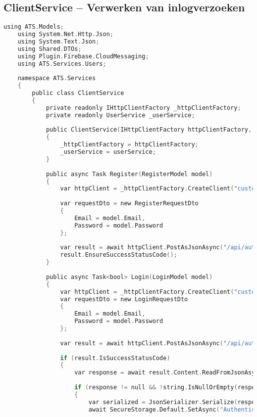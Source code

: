 \subsection{ClientService – Verwerken van inlogverzoeken}

\begin{lstlisting}[language=C, caption=Authenticatie via de ClientService, label=lst:login-clientservice]
    using ATS.Models;
    using System.Net.Http.Json;
    using System.Text.Json;
    using Shared.DTOs;
    using Plugin.Firebase.CloudMessaging;
    using ATS.Services.Users;
    
    namespace ATS.Services
    {
        public class ClientService
        {
            private readonly IHttpClientFactory _httpClientFactory;
            private readonly UserService _userService;
            
            public ClientService(IHttpClientFactory httpClientFactory, UserService userService)
            {
                _httpClientFactory = httpClientFactory;
                _userService = userService;
            }
            
            public async Task Register(RegisterModel model)
            {
                var httpClient = _httpClientFactory.CreateClient("custom-httpclient");
                
                var requestDto = new RegisterRequestDto
                {
                    Email = model.Email,
                    Password = model.Password
                };
                
                var result = await httpClient.PostAsJsonAsync("/api/auth/register", requestDto);
                result.EnsureSuccessStatusCode(); 
            }
            
            public async Task<bool> Login(LoginModel model)
            {
                var httpClient = _httpClientFactory.CreateClient("custom-httpclient");
                var requestDto = new LoginRequestDto
                {
                    Email = model.Email,
                    Password = model.Password
                };
                
                var result = await httpClient.PostAsJsonAsync("/api/auth/login", requestDto);
                
                if (result.IsSuccessStatusCode)
                {
                    var response = await result.Content.ReadFromJsonAsync<LoginResponseDto>();
                    
                    if (response != null && !string.IsNullOrEmpty(response.UserName))
                    {
                        var serialized = JsonSerializer.Serialize(response);
                        await SecureStorage.Default.SetAsync("Authentication", serialized);
                        

\end{lstlisting}
